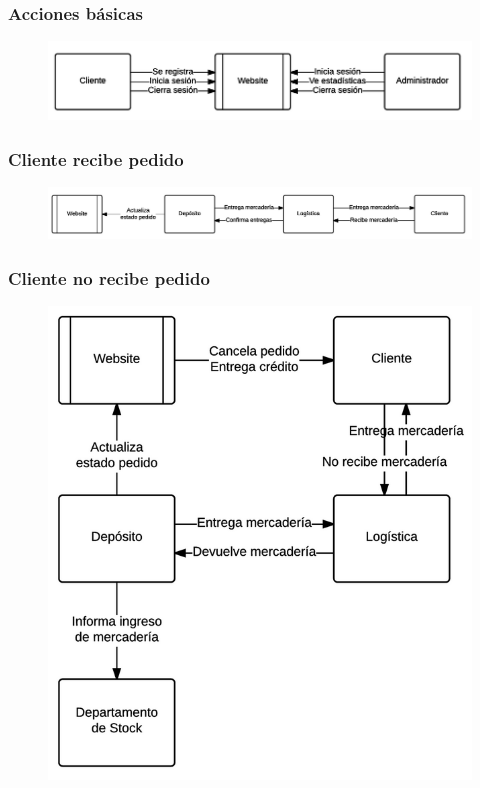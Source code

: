 \subsubsection{Acciones básicas}
\begin{figure}[H]
  \includegraphics[width=\linewidth]{images/acciones-basicas.png}
\end{figure}

\clearpage
\subsubsection{Cliente recibe pedido}
\begin{figure}[H]
  \includegraphics[width=\linewidth]{images/cliente-recibe-pedido.png}
\end{figure}

\clearpage
\subsubsection{Cliente no recibe pedido}
\begin{figure}[H]
  \includegraphics[width=\linewidth]{images/cliente-no-recibe-pedido.png}
\end{figure}


